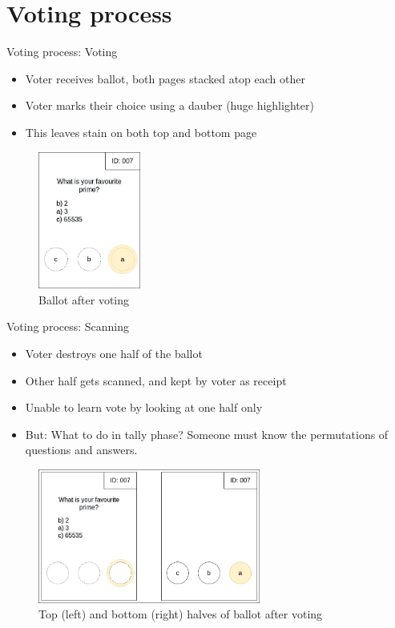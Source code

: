 \documentclass{beamer}
\begin{document}
\section{Voting process}

\begin{frame}{Voting process: Voting}
	\begin{itemize}
		\item Voter receives ballot, both pages stacked atop each other
		\item Voter marks their choice using a dauber (huge highlighter)
		\item This leaves stain on both top and bottom page
	\end{itemize}
	\begin{figure}
		\centering
		\includegraphics[width=0.3\textwidth]{../resources/high_level_ballot_voted.drawio.png}
		\caption{Ballot after voting}
	\end{figure}
\end{frame}

\begin{frame}{Voting process: Scanning}
	\begin{itemize}
		\item Voter destroys one half of the ballot
		\item Other half gets scanned, and kept by voter as receipt
		\item Unable to learn vote by looking at one half only
		\item But: What to do in tally phase? Someone must know the
			permutations of questions and answers.
	\end{itemize}
	\begin{figure}
		\centering
		\includegraphics[width=0.65\textwidth]{../resources/high_level_ballot_voted_split.drawio.png}
		\caption{Top (left) and bottom (right) halves of ballot after voting}
	\end{figure}
\end{frame}
\end{document}
